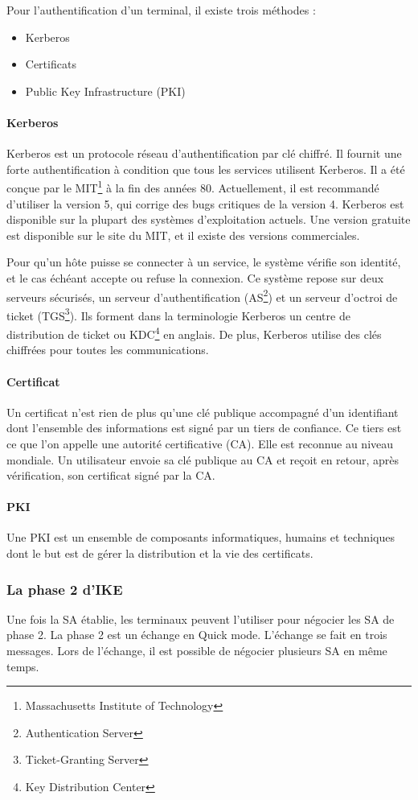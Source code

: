 Pour l'authentification d'un terminal, il existe trois méthodes : 
\begin{itemize}
	\item Kerberos
	\item Certificats	
	\item Public Key Infrastructure (PKI)
\end{itemize}

\paragraph{Kerberos}
Kerberos est un protocole réseau d'authentification par clé chiffré.
Il fournit une forte authentification à condition que tous les services utilisent Kerberos.
Il a été conçue par le MIT\footnote{Massachusetts Institute of Technology} à la fin des années 80.
Actuellement, il est recommandé d'utiliser la version 5, qui corrige des bugs critiques de la version 4.
Kerberos est disponible sur la plupart des systèmes d'exploitation actuels.
Une version gratuite est disponible sur le site du MIT, et il existe des versions commerciales.

Pour qu'un hôte puisse se connecter à un service, le système vérifie son identité, et le cas échéant accepte ou refuse la connexion.
Ce système repose sur deux serveurs sécurisés, un serveur d'authentification (AS\footnote{Authentication Server}) et un serveur d'octroi de ticket (TGS\footnote{Ticket-Granting Server}).
Ils forment dans la terminologie Kerberos un centre de distribution de ticket ou KDC\footnote{Key Distribution Center} en anglais.
De plus, Kerberos utilise des clés chiffrées pour toutes les communications.

\paragraph{Certificat}
Un certificat n'est rien de plus qu'une clé publique accompagné d'un identifiant dont l'ensemble des informations est signé par un tiers de confiance.
Ce tiers est ce que l'on appelle une autorité certificative (CA). 
Elle est reconnue au niveau mondiale.
Un utilisateur envoie sa clé publique au CA et reçoit en retour, après vérification, son certificat signé par la CA.

\paragraph{PKI}
Une PKI est un ensemble de composants informatiques, humains et techniques dont le but est de gérer la distribution et la vie des certificats.

\subsubsection{La phase 2 d'IKE}
Une fois la SA établie, les terminaux peuvent l'utiliser pour négocier les SA de phase 2. 
La phase 2 est un échange en Quick mode. 
L'échange se fait en trois messages. 
Lors de l'échange, il est possible de négocier plusieurs SA en même temps. 